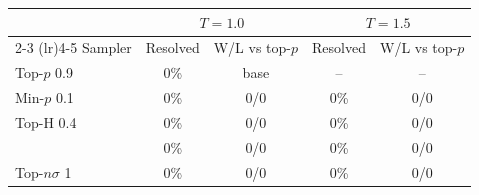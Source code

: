 \begin{tabular}{lcccc}
\toprule
 & \multicolumn{2}{c}{$T{=}1.0$} & \multicolumn{2}{c}{$T{=}1.5$} \\
\cmidrule(lr){2-3} \cmidrule(lr){4-5}
Sampler & Resolved & W/L vs top-$p$ & Resolved & W/L vs top-$p$ \\
\midrule
Top-$p$ 0.9 & 0\% & base & -- & -- \\
Min-$p$ 0.1 & 0\% & 0/0 & 0\% & 0/0 \\
Top-H 0.4 & 0\% & 0/0 & 0\% & 0/0 \\
\pless{} & 0\% & 0/0 & 0\% & 0/0 \\
Top-$n\sigma$ 1 & 0\% & 0/0 & 0\% & 0/0 \\
\bottomrule
\end{tabular}

